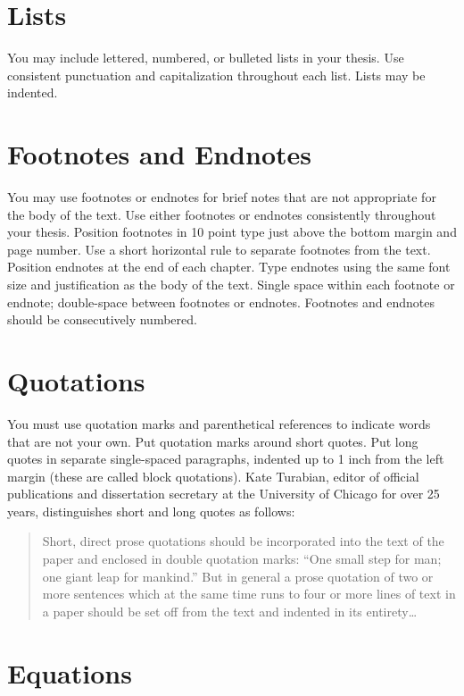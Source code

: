 \section{Lists}

You may include lettered, numbered, or bulleted lists in your thesis.
Use consistent punctuation and capitalization throughout each list.
Lists may be indented.

\section{Footnotes and Endnotes}

You may use footnotes or endnotes for brief notes that are not appropriate for
the body of the text.  Use either footnotes or endnotes consistently throughout
your thesis.  Position footnotes in 10 point type just above the bottom margin
and page number.  Use a short horizontal rule to separate footnotes from the
text.  Position endnotes at the end of each chapter.  Type endnotes using the
same font size and justification as the body of the text.  Single space within
each footnote or endnote; double-space between footnotes or endnotes.
Footnotes and endnotes should be consecutively numbered.

\section{Quotations}

You must use quotation marks and parenthetical references to indicate words
that are not your own. Put quotation marks around short quotes.  Put long
quotes in separate single-spaced paragraphs, indented up to 1 inch from the
left margin (these are called block quotations).  Kate Turabian, editor of
official publications and dissertation secretary at the University of Chicago
for over 25 years, distinguishes short and long quotes as follows:

\begin{quote}
  Short, direct prose quotations should be incorporated into the text
  of the paper and enclosed in double quotation marks: ``One small step
  for man; one giant leap for mankind.'' But in general a prose
  quotation of two or more sentences which at the same time runs to
  four or more lines of text in a paper should be set off from the
  text and indented in its entirety\dots~\cite{Turabian}
\end{quote}

\section{Equations}

